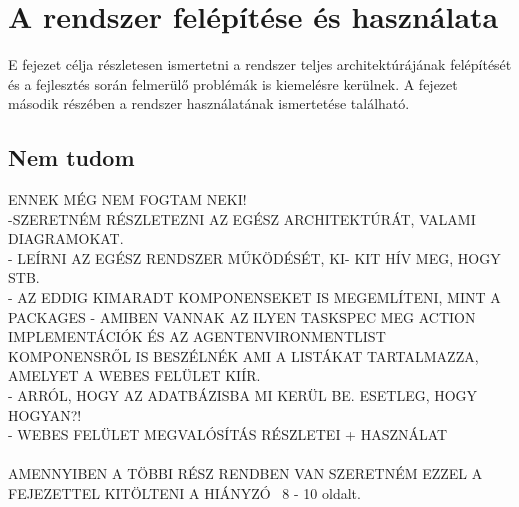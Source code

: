 \chapter{A rendszer felépítése és használata}\label{ch:FELEPITES}

\begin{osszefoglal}
	E fejezet célja részletesen ismertetni a rendszer teljes architektúrájának felépítését és a fejlesztés során felmerülő problémák is kiemelésre kerülnek. A fejezet második részében a rendszer használatának ismertetése található. 
\end{osszefoglal}


\section{Nem tudom}\label{sec:Igen}

	
ENNEK MÉG NEM FOGTAM NEKI! 
\\-SZERETNÉM RÉSZLETEZNI AZ EGÉSZ ARCHITEKTÚRÁT, VALAMI DIAGRAMOKAT.
\\- LEÍRNI AZ EGÉSZ RENDSZER MŰKÖDÉSÉT, KI- KIT HÍV MEG, HOGY STB.
\\- AZ EDDIG KIMARADT KOMPONENSEKET IS MEGEMLÍTENI, MINT A PACKAGES - AMIBEN VANNAK AZ ILYEN TASKSPEC MEG ACTION IMPLEMENTÁCIÓK ÉS AZ AGENTENVIRONMENTLIST KOMPONENSRŐL IS BESZÉLNÉK AMI A LISTÁKAT TARTALMAZZA, AMELYET A WEBES FELÜLET KIÍR.
\\- ARRÓL, HOGY AZ ADATBÁZISBA MI KERÜL BE. ESETLEG, HOGY HOGYAN?!
\\- WEBES FELÜLET MEGVALÓSÍTÁS RÉSZLETEI + HASZNÁLAT
\\
\\AMENNYIBEN A TÖBBI RÉSZ RENDBEN VAN SZERETNÉM EZZEL A FEJEZETTEL KITÖLTENI A HIÁNYZÓ ~8 - 10 oldalt.





